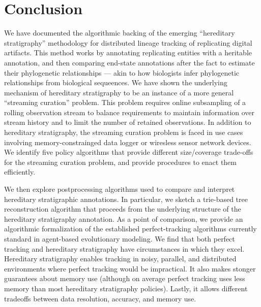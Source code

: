 \section{Conclusion} \label{sec:conclusion}

We have documented the algorithmic backing of the emerging ``hereditary stratigraphy'' methodology for distributed lineage tracking of replicating digital artifacts.
This method works by annotating replicating entities with a heritable annotation, and then comparing end-state annotations after the fact to estimate their phylogenetic relationships --- akin to how biologists infer phylogenetic relationships from biological sequeences.
We have shown the underlying mechanism of hereditary stratigraphy to be an instance of a more general ``streaming curation'' problem.
This problem requires online subsampling of a rolling observation stream to balance requirements to maintain information over stream history and to limit the number of retained observations.
In addition to hereditary stratigraphy, the streaming curation problem is faced in use cases involving memory-constrainged data logger or wiresless sensor network devices.
We identify five policy algorithms that provide different size/coverage trade-offs for the streaming curation problem, and provide procedures to enact them efficiently.

We then explore postprocessing algorithms used to compare and interpret hereditary stratigraphic annotations.
In particular, we sketch a trie-based tree reconstruction algorithm that proceeds from the underlying structure of the hereditary stratigraphy annotation.
As a point of comparison, we provide an algorithmic formalization of the established perfect-tracking algorithms currently standard in agent-based evolutionary modeling.
We find that both perfect tracking and hereditary stratigraphy have circumstances in which they excel.
Hereditary stratigraphy enables tracking in noisy, parallel, and distributed environments where perfect tracking would be impractical.
It also makes stonger guarantees about memory use (although on average perfect tracking uses less memory than most hereditary stratigraphy policies).
Lastly, it allows different tradeoffs between data resolution, accuracy, and memory use.

